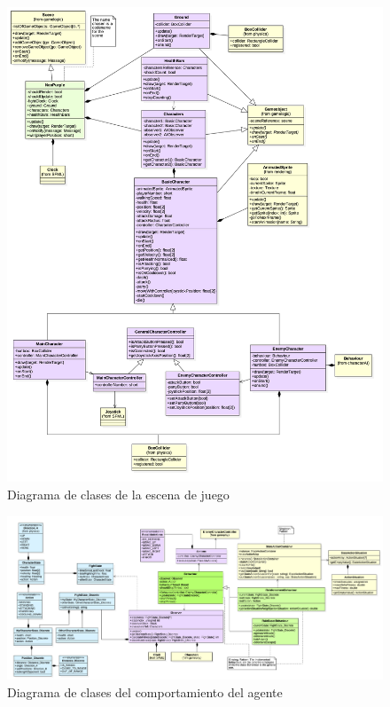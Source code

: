 \begin{figure}
	\caption{Diagrama de clases de la escena de juego}
	\hspace*{+1cm}  
	\centerline{\includegraphics[width=20cm]{otros/UML/png/alld/png/gamelogic__gameplay__diagramaDeClases_scene_gameplay_4.png}}
	\label{class:gameplay}
\end{figure}

\clearpage
\begin{landscape}
\begin{figure}
	\begin{adjustwidth}{-3cm}{}
		\includegraphics[width=24cm]{otros/UML/png/alld/png/gamelogic__gameplay__characterAI__diagramaDeClases_IA_5.png}
		\caption{Diagrama de clases del comportamiento del agente}
		\label{class:agent}
	\end{adjustwidth}
\end{figure}
\end{landscape}
\clearpage


